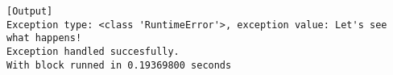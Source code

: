 \begin{Verbatim}[label=\makebox{\url{https://github.com/lucabaldini/cmepda/tree/master/slides/latex/snippets/context\_manager.py}},commandchars=\\\{\}]
[Output]
Exception type: <class 'RuntimeError'>, exception value: Let's see what happens!
Exception handled succesfully.
With block runned in 0.19369800 seconds
\end{Verbatim}
